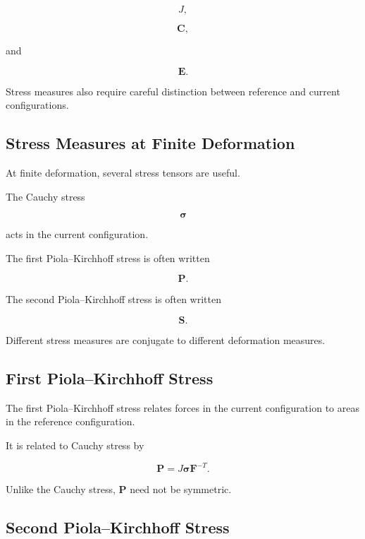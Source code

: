 \[
\boxed{
J,
}
\]

\[
\boxed{
\mathbf{C},
}
\]

and

\[
\boxed{
\mathbf{E}.
}
\]

Stress measures also require careful distinction between reference and
current configurations.

\subsection{Stress Measures at Finite Deformation}
\label{subsec:finite-stress-measures}

At finite deformation, several stress tensors are useful.

The Cauchy stress

\[
\boxed{
\boldsymbol{\sigma}
}
\]

acts in the current configuration.

The first Piola--Kirchhoff stress is often written

\[
\boxed{
\mathbf{P}.
}
\]

The second Piola--Kirchhoff stress is often written

\[
\boxed{
\mathbf{S}.
}
\]

Different stress measures are conjugate to different deformation measures.

\subsection{First Piola--Kirchhoff Stress}
\label{subsec:first-piola-kirchhoff}

The first Piola--Kirchhoff stress relates forces in the current
configuration to areas in the reference configuration.

It is related to Cauchy stress by

\[
\boxed{
\mathbf{P}
=
J
\boldsymbol{\sigma}
\mathbf{F}^{-T}.
}
\]

Unlike the Cauchy stress, \(\mathbf{P}\) need not be symmetric.

\subsection{Second Piola--Kirchhoff Stress}
\label{subsec:second-piola-kirchhoff}

